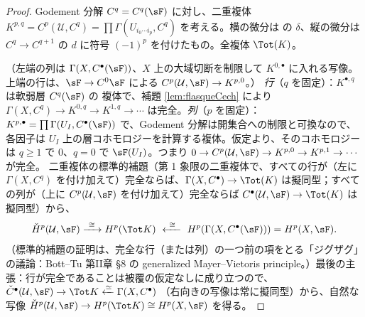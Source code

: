 \begin{proof}
Godement 分解 $C^q=C^q(\sF)$ に対し、二重複体 $K^{p,q}=C^p(\mathcal U,C^q)=\prod\Gamma(U_{i_0\cdots i_p},C^q)$ を考える。横の微分は \Cech{} の $\delta$、縦の微分は $C^q\to C^{q+1}$ の $d$ に符号 $(-1)^p$ を付けたもの。全複体 $\Tot(K)$。
\begin{center}
\end{center}
（左端の列は $\Gamma(X,C^\bullet(\sF))$、$X$ 上の大域切断を制限して $K^{0,\bullet}$ に入れる写像。上端の行は、$\sF\to C^0\sF$ による $C^p(\mathcal U,\sF)\to K^{p,0}$。）
\emph{行}（$q$ を固定）：$K^{\bullet,q}$ は軟弱層 $C^q(\sF)$ の \Cech{} 複体で、補題 \ref{lem:flasqueCech} により $\Gamma(X,C^q)\to K^{0,q}\to K^{1,q}\to\cdots$ は完全。\emph{列}（$p$ を固定）：$K^{p,\bullet}=\prod\Gamma(U_I,C^\bullet(\sF))$ で、Godement 分解は開集合への制限と可換なので、各因子は $U_I$ 上の層コホモロジーを計算する複体。仮定より、そのコホモロジーは $q\ge1$ で $0$、$q=0$ で $\sF(U_I)$。つまり $0\to C^p(\mathcal U,\sF)\to K^{p,0}\to K^{p,1}\to\cdots$ が完全。
二重複体の標準的補題（第 1 象限の二重複体で、すべての行が（左に $\Gamma(X,C^q)$ を付け加えて）完全ならば、$\Gamma(X,C^\bullet)\to\Tot(K)$ は擬同型；すべての列が（上に $C^p(\mathcal U,\sF)$ を付け加えて）完全ならば $C^\bullet(\mathcal U,\sF)\to\Tot(K)$ は擬同型）から、
\[
\check H^p(\mathcal U,\sF)\xrightarrow{\ \cong\ }H^p(\Tot K)\ \xleftarrow{\ \cong\ }\ H^p(\Gamma(X,C^\bullet(\sF)))=H^p(X,\sF).
\]
（標準的補題の証明は、完全な行（または列）の一つ前の項をとる「ジグザグ」の議論：Bott--Tu 第II章 §8 の generalized Mayer--Vietoris principle。）最後の主張：行が完全であることは被覆の仮定なしに成り立つので、$\check C^\bullet(\mathcal U,\sF)\to\Tot K\xleftarrow{\simeq}\Gamma(X,C^\bullet)$ （右向きの写像は常に擬同型）から、自然な写像 $\check H^p(\mathcal U,\sF)\to H^p(\Tot K)\cong H^p(X,\sF)$ を得る。\qedhere
\end{proof}

